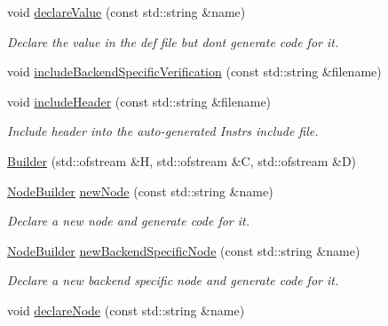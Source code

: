 \begin{DoxyCompactItemize}
void \hyperlink{class_builder_adf3bbe78f298430862ea6a9b2729164a}{declare\+Value} (const std\+::string \&name)
\begin{DoxyCompactList}\small\item\em Declare the value in the def file but don\textquotesingle{}t generate code for it. \end{DoxyCompactList}\item 
void \hyperlink{class_builder_ab3a71329b155fa1c5f1a032cc0a99ada}{include\+Backend\+Specific\+Verification} (const std\+::string \&filename)
\item 
\mbox{\label{class_builder_ada675cf949abede7bead34d8dba2c5c4}} 
void \hyperlink{class_builder_ada675cf949abede7bead34d8dba2c5c4}{include\+Header} (const std\+::string \&filename)
\begin{DoxyCompactList}\small\item\em Include header into the auto-\/generated Instrs include file. \end{DoxyCompactList}\item 
\hyperlink{class_builder_a1a3f96e2daf78e66733ecd941d0eb5ec}{Builder} (std\+::ofstream \&H, std\+::ofstream \&C, std\+::ofstream \&D)
\item 
\mbox{\label{class_builder_a088818890b456f7c4abeea3958f6a787}} 
\hyperlink{class_node_builder}{Node\+Builder} \hyperlink{class_builder_a088818890b456f7c4abeea3958f6a787}{new\+Node} (const std\+::string \&name)
\begin{DoxyCompactList}\small\item\em Declare a new node and generate code for it. \end{DoxyCompactList}\item 
\mbox{\label{class_builder_a4d7ab24c750aff72ec00291c2274654f}} 
\hyperlink{class_node_builder}{Node\+Builder} \hyperlink{class_builder_a4d7ab24c750aff72ec00291c2274654f}{new\+Backend\+Specific\+Node} (const std\+::string \&name)
\begin{DoxyCompactList}\small\item\em Declare a new backend specific node and generate code for it. \end{DoxyCompactList}\item 
\mbox{\label{class_builder_ab369a6b4fd595029929a71930b543638}} 
void \hyperlink{class_builder_ab369a6b4fd595029929a71930b543638}{declare\+Node} (const std\+::string \&name)

\end{DoxyCompactItemize}

